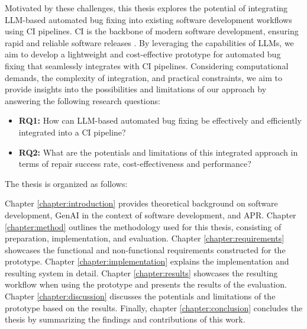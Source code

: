 Motivated by these challenges, this thesis explores the potential of integrating LLM-based automated bug fixing into existing software development workflows using \ac{CI} pipelines. \ac{CI} is the backbone of modern software development, ensuring rapid and reliable software releases \cite{ugwuezeContinuousIntegrationDeployment2024}. By leveraging the capabilities of \acp{LLM}, we aim to develop a lightweight and cost-effective prototype for automated bug fixing that seamlessly integrates with \ac{CI} pipelines. Considering computational demands, the complexity of integration, and practical constraints, we aim to provide insights into the possibilities and limitations of our approach by answering the following research questions:

\vspace{1em}

\begin{itemize}
    \item \textbf{RQ1:} How can LLM-based automated bug fixing be effectively and efficiently integrated into a CI pipeline?
    \item \textbf{RQ2:} What are the potentials and limitations of this integrated approach in terms of repair success rate, cost-effectiveness and performance?
\end{itemize}

The thesis is organized as follows:

Chapter \ref{chapter:introduction} provides theoretical background on software development, \ac{GenAI} in the context of software development, and \ac{APR}. Chapter \ref{chapter:method} outlines the methodology used for this thesis, consisting of preparation, implementation, and evaluation. Chapter \ref{chapter:requirements} showcases the functional and non-functional requirements constructed for the prototype.
Chapter \ref{chapter:implementation} explains the implementation and resulting system in detail. Chapter \ref{chapter:results} showcases the resulting workflow when using the prototype and presents the results of the evaluation. Chapter \ref{chapter:discussion} discusses the potentials and limitations of the prototype based on the results. Finally, chapter \ref{chapter:conclusion} concludes the thesis by summarizing the findings and contributions of this work.
